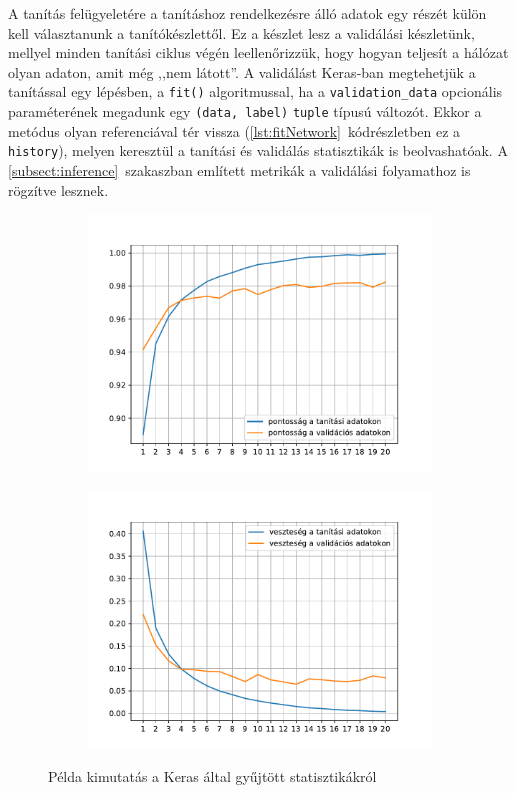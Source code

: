 A tanítás felügyeletére a tanításhoz rendelkezésre álló adatok egy részét külön kell választanunk a tanítókészlettől. Ez a készlet lesz a validálási készletünk, mellyel minden tanítási ciklus végén leellenőrizzük, hogy hogyan teljesít a hálózat olyan adaton, amit még ,,nem látott''. A validálást Keras-ban megtehetjük a tanítással egy lépésben, a \verb|fit()| algoritmussal, ha a \verb|validation_data| opcionális paraméterének megadunk egy \verb|(data, label)| \verb|tuple| típusú változót. Ekkor a metódus olyan referenciával tér vissza (\ref{lst:fitNetwork}~kódrészletben ez a \verb|history|), melyen keresztül a tanítási és validálás statisztikák is beolvashatóak. A \ref{subsect:inference}~szakaszban említett metrikák a validálási folyamathoz is rögzítve lesznek. 
\begin{figure}[H]
	\centering
	\begin{subfigure}{0.45\textwidth}
		\includegraphics[width=\textwidth]{fig/accuracy.pdf}
		\label{fig:plotacc}
	\end{subfigure}
	\quad
	\begin{subfigure}{0.45\textwidth}
		\includegraphics[width=\textwidth]{fig/loss.pdf}
		\label{fig:plotloss}
	\end{subfigure}
	\caption{Példa kimutatás a Keras által gyűjtött statisztikákról}
\end{figure}